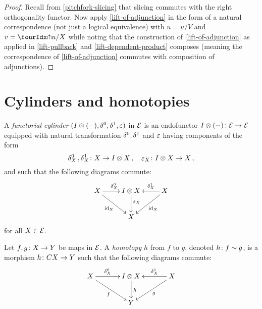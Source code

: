 \documentclass[reqno,10pt,a4paper,oneside]{amsart}
\begin{document}
\begin{proof}
Recall from \cref{pitchfork-slicing} that slicing commutes with the right orthogonality functor.
Now apply \cref{lift-of-adjunction} in the form of a natural correspondence (not just a logical equivalence) with $u = u/V$ and $v = \liftr{u}/X$ while noting that the construction of \cref{lift-of-adjunction} as applied in \cref{lift-pullback} and \cref{lift-dependent-product} composes (meaning the correspondence of \cref{lift-of-adjunction} commutes with composition of adjunctions).
\end{proof}


\section{Cylinders and homotopies}
\label{sec:preliminaries}



\begin{definition} \label{def:cylinder}
 A \emph{functorial cylinder} $(I \otimes (-), \delta^0, \delta^1, \varepsilon)$ in $\mathcal{E}$ 
is an endofunctor $I \otimes (-) \colon \mathcal{E} \to \mathcal{E}$ equipped with natural transformation $\delta^0, \delta^1$ and $\varepsilon$ having components
of the form
\[
\delta^0_X \, , \delta^1_X \colon X \to I \otimes X \, , \quad \varepsilon_X \colon I \otimes X \to X \, ,
 \]
and such that the following diagrams commute:
\[
\xymatrix{
X  \ar[r]^{\lcyl_X} \ar[dr]_{\id_X} & \interval \otimes X \ar[d]^-(.4){\varepsilon_X} & X \ar[dl]^{\id_X} \ar[l]_-{\rcyl_X}  \\
 & X & }
 \]
 for all $X \in \mathcal{E}$.
\end{definition}


\begin{definition}
\label{def:homotopy}
Let $f, g \colon X \to Y$ be maps in $\mathcal{E}$. A \emph{homotopy} $h$ from $f$ to $g$, denoted $h \colon f \sim g$, is a morphism $h \colon C X \to Y$ such that the following diagrams commute:
\[
\xymatrix@C=1.2cm{
X \ar[r]^-{\lcyl_X} \ar[dr]_{f} & \interval \otimes X \ar[d]^{h} & X \ar[dl]^{g} \ar[l]_-{\rcyl_X}  \\
 & Y & }
 \]
\end{definition}
\end{document}
